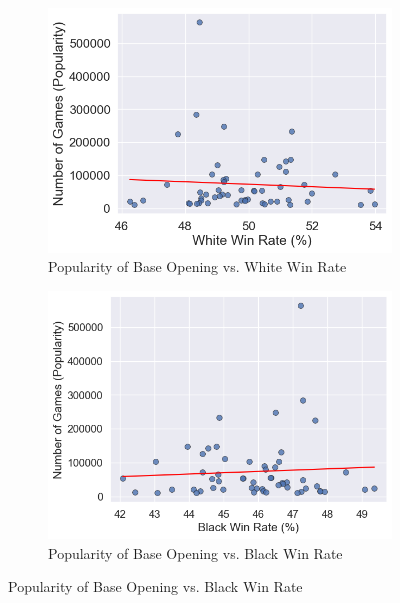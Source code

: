 \documentclass[a4paper, 11pt]{article}
\begin{document}
\begin{figure}[H]
    \centering
    \caption{Popularity of Base Opening vs. Win Rates (All Players)}
    \label{fig:popularityOfBaseOpeningVsWinRatesAllPlayers}
    \begin{subfigure}{0.49\textwidth}
        \centering
        \caption{Popularity of Base Opening vs. White Win Rate}
        \label{fig:popularityOfBaseOpeningVsWhiteWinRateAllPlayers}
        \includegraphics[width=\textwidth]{Popularity of Base Opening vs. White Win Rate (All Rated Players).png}
    \end{subfigure}
    \hfill
    \begin{subfigure}{0.49\textwidth}
        \centering
        \caption{Popularity of Base Opening vs. Black Win Rate}
        \label{fig:popularityOfBaseOpeningVsBlackWinRateAllPlayers}
        \includegraphics[width=\textwidth]{Popularity of Base Opening vs. Black Win Rate (All Rated Players).png}
    \end{subfigure}
\end{figure}
\end{document}
